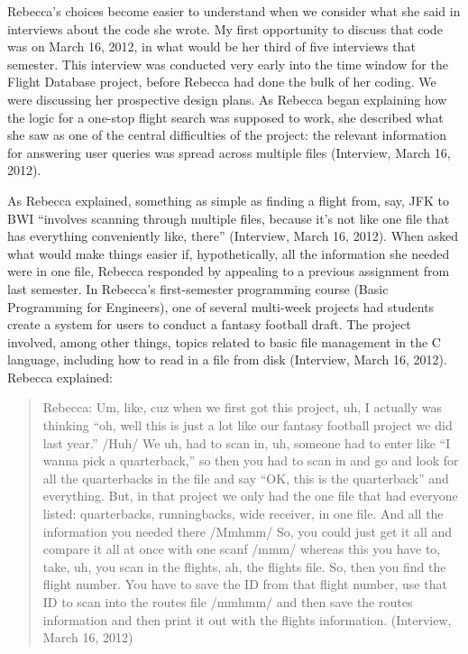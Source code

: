 Rebecca's choices become easier to understand when we consider what she said in  interviews about the code she wrote. My first opportunity to discuss that code was on March 16, 2012, in what would be her third of five interviews that semester. This interview was conducted very early into the time window for the Flight Database project, before Rebecca had done the bulk of her coding. We were discussing her prospective design plans. As Rebecca began explaining how the logic for a one-stop flight search was supposed to work, she described what she saw as one of the central difficulties of the project: the relevant information for answering user queries was spread across multiple files (Interview, March 16, 2012).

As Rebecca explained, something as simple as finding a flight from, say, JFK to BWI ``involves scanning through multiple files, because it's not like one file that has everything conveniently like, there'' (Interview, March 16, 2012). When asked what would make things easier if, hypothetically, all the information she needed were in one file, Rebecca responded by appealing to a previous assignment from last semester. In Rebecca's first-semester programming course (Basic Programming for Engineers), one of several multi-week projects had students create a system for users to conduct a fantasy football draft. The project involved, among other things, topics related to basic file management in the C language, including how to read in a file from disk (Interview, March 16, 2012). Rebecca explained:


\begin{quote}
  Rebecca: Um, like, cuz when we first got this project, uh, I actually was thinking ``oh, well this is just a lot like our fantasy football project we did last year.'' /Huh/ We uh, had to scan in, uh, someone had to enter like ``I wanna pick a quarterback,'' so then you had to scan in and go and look for all the quarterbacks in the file and say ``OK, this is the quarterback'' and everything. But, in that project we only had the one file that had everyone listed: quarterbacks, runningbacks, wide receiver, in one file. And all the information you needed there /Mmhmm/ So, you could just get it all and compare it all at once with one scanf /mmm/ whereas this you have to, take, uh, you scan in the flights, ah, the flights file. So, then you find the flight number. You have to save the ID from that flight number, use that ID to scan into the routes file /mmhmm/ and then save the routes information and then print it out with the flights information. (Interview, March 16, 2012)
\end{quote}


